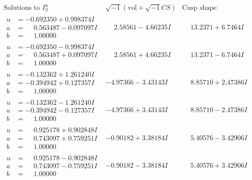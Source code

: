 \documentclass[1p]{elsarticle_modified}
\theoremstyle{definition}
\newcommand{\I}{\sqrt{-1}}
\begin{document}
$$\begin{array}{c|c|c}  
\text{Solutions to }I^u_{3}& \I (\text{vol} + \sqrt{-1}CS) & \text{Cusp shape}\\
 \hline 
\begin{aligned}
u &= -0.692350 + 0.998374 I \\
a &= \phantom{-}0.563487 - 0.097097 I \\
b &= \phantom{-}1.00000\phantom{ +0.000000I}\end{aligned}
 & \phantom{-}2.58561 - 4.66235 I & \phantom{-}13.2371 + 6.7464 I \\ \hline\begin{aligned}
u &= -0.692350 - 0.998374 I \\
a &= \phantom{-}0.563487 + 0.097097 I \\
b &= \phantom{-}1.00000\phantom{ +0.000000I}\end{aligned}
 & \phantom{-}2.58561 + 4.66235 I & \phantom{-}13.2371 - 6.7464 I \\ \hline\begin{aligned}
u &= -0.132362 + 1.261240 I \\
a &= -0.394942 + 0.127357 I \\
b &= \phantom{-}1.00000\phantom{ +0.000000I}\end{aligned}
 & -4.97366 - 3.43143 I & \phantom{-}8.85710 + 2.47386 I \\ \hline\begin{aligned}
u &= -0.132362 - 1.261240 I \\
a &= -0.394942 - 0.127357 I \\
b &= \phantom{-}1.00000\phantom{ +0.000000I}\end{aligned}
 & -4.97366 + 3.43143 I & \phantom{-}8.85710 - 2.47386 I \\ \hline\begin{aligned}
u &= \phantom{-}0.925178 + 0.902848 I \\
a &= \phantom{-}0.743097 + 0.759251 I \\
b &= \phantom{-}1.00000\phantom{ +0.000000I}\end{aligned}
 & -0.90182 + 3.38184 I & \phantom{-}5.40576 - 3.42906 I \\ \hline\begin{aligned}
u &= \phantom{-}0.925178 - 0.902848 I \\
a &= \phantom{-}0.743097 - 0.759251 I \\
b &= \phantom{-}1.00000\phantom{ +0.000000I}\end{aligned}
 & -0.90182 - 3.38184 I & \phantom{-}5.40576 + 3.42906 I \\ \hline\begin{aligned}

\end{aligned}
\end{array}$$
\end{document}
